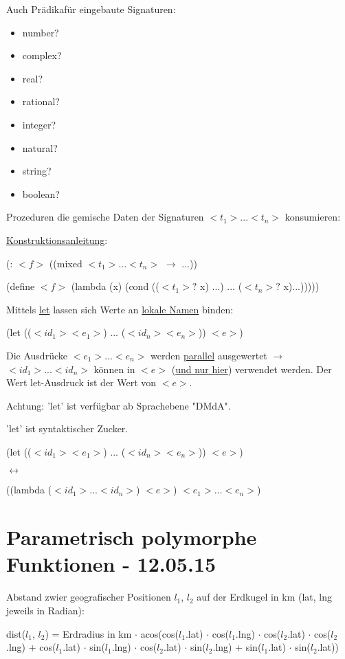 \documentclass[a4paper, 20pt, openany]{book}
\begin{document}
Auch Prädikafür eingebaute Signaturen:

\begin{itemize}
  \item number?
  \item complex?
  \item real?
  \item rational?
  \item integer?
  \item natural?
  \item string?
  \item boolean?
\end{itemize}

Prozeduren die gemische Daten der Signaturen $<t_1>...<t_n>$ konsumieren:

\underline{Konstruktionsanleitung}:

(: $<f>$ ((mixed $<t_1>...<t_n>$ $\rightarrow$ ...))

(define $<f>$ (lambda (x) (cond (($<t_1>?$ x) ...) ... ($<t_n>?$ x)...)))))

Mittels \underline{let} lassen sich Werte an \underline{lokale Namen} binden:

\begin{center}
  (let (($<id_1> <e_1>$) ... ($<id_n> <e_n>$)) $<e>$)
\end{center}

Die Ausdrücke $<e_1>...<e_n>$ werden \underline{parallel} ausgewertet $\rightarrow$ $<id_1>...<id_n>$ können in $<e>$ (\underline{und nur hier}) verwendet werden. Der Wert let-Ausdruck ist der Wert von $<e>$.

Achtung: 'let' ist verfügbar ab Sprachebene "DMdA".

'let' ist syntaktischer Zucker.

(let (($<id_1> <e_1>$) ... ($<id_n> <e_n>$)) $<e>$)

$\leftrightarrow$

((lambda ($<id_1>...<id_n>$) $<e>$) $<e_1>...<e_n>$)

\chapter{Parametrisch polymorphe Funktionen - 12.05.15}
Abstand zwier geografischer Positionen $l_1$, $l_2$ auf der Erdkugel in km (lat, lng jeweils in Radian):

dist($l_1$, $l_2$) = Erdradius in km $\cdot$ acos(cos($l_1$.lat) $\cdot$ cos($l_1$.lng) $\cdot$ cos($l_2$.lat) $\cdot$ cos($l_2$.lng) + cos($l_1$.lat) $\cdot$ sin($l_1$.lng) $\cdot$ cos($l_2$.lat) $\cdot$ sin($l_2$.lng) + sin($l_1$.lat) $\cdot$ sin($l_2$.lat))
\end{document}
